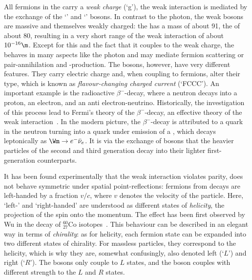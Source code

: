 All fermions in the \sm carry a \emph{weak charge} (`g'), the weak interaction is mediated by the exchange of the `\Z' and `\W' bosons.
In contrast to the photon, the weak bosons are massive and themselves weakly charged: the \Z has a mass of about 91\gev, the \W of about 80\gev, resulting in a very short range of the weak interaction of about $10^{-16}\m$.
Except for this and the fact that it couples to the weak charge, the \Z behaves in many aspects like the photon and may mediate fermion scattering or pair-annihilation and -production.
The \W bosons, however, have very different features.
They carry electric charge and, when coupling to fermions, alter their type, which is known as \emph{flavour-changing charged current} (`FCCC').
An important example is the radioactive $\beta^{-}$-decay, where a neutron decays into a proton, an electron, and an anti electron-neutrino.
Historically, the investigation of this process lead to Fermi's theory of the $\beta^{-}$-decay, an effective theory of the weak interaction~\cite{Fermi:1934}.
In the modern picture, the $\beta^{-}$-decay is attributed to a \qd quark in the neutron turning into a \qu quark under emission of a \Wm, which decays leptonically as \mbox{$\Wm\rightarrow e^{-}\bar{\nu}_{e}$}.
It is via the exchange of \W bosons that the heavier particles of the second and third generation decay into their lighter first-generation counterparts.

It has been found experimentally that the weak interaction violates parity, \ie does not behave symmetric under spatial point-reflections:
fermions from \W decays are left-handed by a fraction \mbox{$v/c$}, where $v$ denotes the velocity of the particle.
Here, `left-' and `right-handed' are understood as different states of \emph{helicity}, the projection of the spin onto the momentum.
The effect has been first observed by Wu in the decay of ${}^{60}_{27}\text{Co}$ isotopes~\cite{bib:CPViolation:Wu}.
This behaviour can be described in an elegant way in terms of \emph{chirality}: as for helicity, each fermion state can be expanded into two different states of chirality.
For massless particles, they correspond to the helicity, which is why they are, somewhat confusingly, also denoted left (`$L$') and right (`$R$').
The \W bosons only couple to $L$ states, and the \Z boson couples with different strength to the $L$ and $R$ states.

